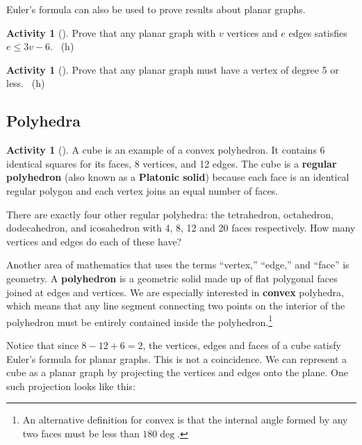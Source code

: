 \documentclass[10pt,]{book}
\newcommand{\terminology}[1]{\textbf{#1}}
\theoremstyle{plain}
\theoremstyle{definition}
\theoremstyle{definition}
\theoremstyle{definition}
\newtheorem{activity}[project]{Activity}
\numberwithin{equation}{chapter}
\begin{document}
\par
\hypertarget{p-290}{}%
Euler's formula can also be used to prove results about planar graphs.%
\begin{activity}[]\label{activity-25}
\hypertarget{p-291}{}%
Prove that any planar graph with \(v\) vertices and \(e\) edges satisfies \(e \le 3v - 6\).%
~{\tiny (h)}\end{activity}
\begin{activity}[]\label{act-planardeg5}
\hypertarget{p-294}{}%
Prove that any planar graph must have a vertex of degree 5 or less.%
~{\tiny (h)}\end{activity}
\typeout{************************************************}
\typeout{************************************************}
\subsection[{Polyhedra}]{Polyhedra}\label{subsection-8}
\begin{activity}[]\label{activity-27}
\hypertarget{p-297}{}%
A cube is an example of a convex polyhedron. It contains 6 identical squares for its faces, 8 vertices, and 12 edges. The cube is a \terminology{regular polyhedron} (also known as a \terminology{Platonic solid}) because each face is an identical regular polygon and each vertex joins an equal number of faces.%
\par
\hypertarget{p-298}{}%
There are exactly four other regular polyhedra: the tetrahedron, octahedron, dodecahedron, and icosahedron with 4, 8, 12 and 20 faces respectively. How many vertices and edges do each of these have?%
\end{activity}
\hypertarget{p-299}{}%
Another area of mathematics that uses the terms ``vertex,'' ``edge,'' and ``face'' is geometry. A \terminology{polyhedron} is a geometric solid made up of flat polygonal faces joined at edges and vertices. We are especially interested in \terminology{convex} polyhedra, which means that any line segment connecting two points on the interior of the polyhedron must be entirely contained inside the polyhedron.\footnote{An alternative definition for convex is that the internal angle formed by any two faces must be less than \(180\deg\).\label{fn-3}}%
\par
\hypertarget{p-300}{}%
Notice that since \(8 - 12 + 6 = 2\), the vertices, edges and faces of a cube satisfy Euler's formula for planar graphs. This is not a coincidence. We can represent a cube as a planar graph by projecting the vertices and edges onto the plane. One such projection looks like this:%
\end{document}
